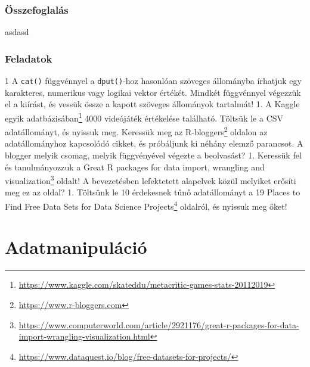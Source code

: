 \documentclass[
]{book}
\makeatletter
\DeclareRobustCommand{\href}[2]{#2\footnote{\url{#1}}}
\renewcommand{\href}[2]{#2\footnote{\url{#1}}}
\newenvironment{kframe}{%
\medskip{}
\setlength{\fboxsep}{.8em}
 \def\at@end@of@kframe{}%
 \ifinner\ifhmode%
  \def\at@end@of@kframe{\end{minipage}}%
  \begin{minipage}{\columnwidth}%
 \fi\fi%
 \def\FrameCommand##1{\hskip\@totalleftmargin \hskip-\fboxsep
 \colorbox{shadecolor}{##1}\hskip-\fboxsep
     \hskip-\linewidth \hskip-\@totalleftmargin \hskip\columnwidth}%
 \MakeFramed {\advance\hsize-\width
   \@totalleftmargin\z@ \linewidth\hsize
   \@setminipage}}%
 {\par\unskip\endMakeFramed%
 \at@end@of@kframe}
\newenvironment{rmdblock}[1]
  {
  \begin{itemize}
  \renewcommand{\labelitemi}{
    \raisebox{-.7\height}[0pt][0pt]{
      {\setkeys{Gin}{width=3em,keepaspectratio}\texttt{[image: images/\#1]}}
    }
  }
  \setlength{\fboxsep}{1em}
  \begin{kframe}
  \item
  }
  {
  \end{kframe}
  \end{itemize}
  }
\newenvironment{rmdsummary}
  {\begin{rmdblock}{summary}}
  {\end{rmdblock}}
\newenvironment{rmdexercise}
  {\begin{rmdblock}{exercise}}
  {\end{rmdblock}}
\makeatother
\begin{document}
\hypertarget{beolvasas-3-summary}{%
\subsection{Összefoglalás}\label{beolvasas-3-summary}}

\begin{rmdsummary}
asdasd
\end{rmdsummary}

\hypertarget{beolvasas-3-exercise}{%
\subsection{Feladatok}\label{beolvasas-3-exercise}}

\begin{rmdexercise}
1 A \texttt{cat()} függvénnyel a \texttt{dput()}-hoz hasonlóan szöveges állományba írhatjuk egy karakteres, numerikus vagy logikai vektor értékét. Mindkét függvénnyel végezzük el a kiírást, és vessük össze a kapott szöveges állományok tartalmát!
1. A \href{https://www.kaggle.com/skateddu/metacritic-games-stats-20112019}{Kaggle egyik adatbázisában} 4000 videójáték értékelése található. Töltsük le a CSV adatállományt, és nyissuk meg. Keressük meg az \href{https://www.r-bloggers.com}{R-bloggers} oldalon az adatállományhoz kapcsolódó cikket, és próbáljunk ki néhány elemző parancsot. A blogger melyik csomag, melyik függvényével végezte a beolvasást?
1. Keressük fel és tanulmányozzuk a \href{https://www.computerworld.com/article/2921176/great-r-packages-for-data-import-wrangling-visualization.html}{Great R packages for data import, wrangling and visualization} oldalt! A bevezetésben lefektetett alapelvek közül melyiket erősíti meg ez az oldal?
1. Töltsünk le 10 érdekesnek tűnő adatállományt a \href{https://www.dataquest.io/blog/free-datasets-for-projects/}{19 Places to Find Free Data Sets for Data Science Projects} oldalról, és nyissuk meg őket!
\end{rmdexercise}

\hypertarget{adatmanipulacio}{%
\chapter{Adatmanipuláció}\label{adatmanipulacio}}
\end{document}

